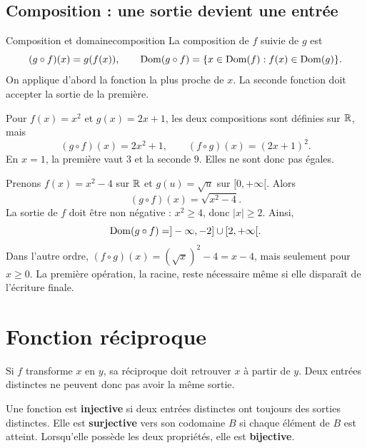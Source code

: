 \subsection*{Composition : une sortie devient une entrée}
\begin{definition}{Composition et domaine}{composition}
La composition de \(f\) suivie de \(g\) est
\[
(g\circ f)(x)=g(f(x)),\qquad
\operatorname{Dom}(g\circ f)=\{x\in\operatorname{Dom}(f):f(x)\in\operatorname{Dom}(g)\}.
\]
On applique d'abord la fonction la plus proche de \(x\). La seconde fonction doit accepter la sortie de la première.
\end{definition}

\begin{examplebox}[title={L'ordre compte}]
Pour \(f(x)=x^2\) et \(g(x)=2x+1\), les deux compositions sont définies sur \(\mathbb{R}\), mais
\[
(g\circ f)(x)=2x^2+1,\qquad (f\circ g)(x)=(2x+1)^2.
\]
En \(x=1\), la première vaut \(3\) et la seconde \(9\). Elles ne sont donc pas égales.
\end{examplebox}

\begin{examplebox}[title={Une composition peut imposer une nouvelle restriction}]
Prenons \(f(x)=x^2-4\) sur \(\mathbb{R}\) et \(g(u)=\sqrt u\) sur \([0,+\infty[\). Alors
\[
(g\circ f)(x)=\sqrt{x^2-4}.
\]
La sortie de \(f\) doit être non négative : \(x^2\ge4\), donc \(|x|\ge2\). Ainsi,
\[
\operatorname{Dom}(g\circ f)=]-\infty,-2]\cup[2,+\infty[.
\]
Dans l'autre ordre, \((f\circ g)(x)=(\sqrt x)^2-4=x-4\), mais seulement pour \(x\ge0\). La première opération, la racine, reste nécessaire même si elle disparaît de l'écriture finale.
\end{examplebox}

\section{Fonction réciproque}
\label{manual:section:03.05}

\begin{intuitionbox}
Si \(f\) transforme \(x\) en \(y\), sa réciproque doit retrouver \(x\) à partir de \(y\). Deux entrées distinctes ne peuvent donc pas avoir la même sortie.
\end{intuitionbox}

Une fonction est \textbf{injective} si deux entrées distinctes ont toujours des sorties distinctes. Elle est \textbf{surjective} vers son codomaine \(B\) si chaque élément de \(B\) est atteint. Lorsqu'elle possède les deux propriétés, elle est \textbf{bijective}.

